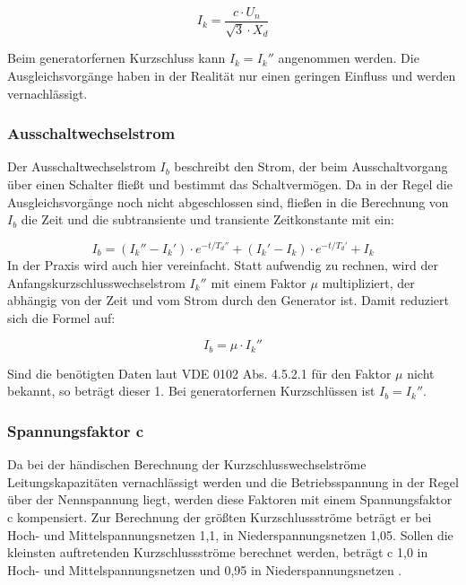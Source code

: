 \documentclass{scrartcl}
\begin{document}
\begin{onehalfspace}
\begin{equation}
I_k = \frac{c \cdot U_n}{\sqrt{3} \cdot X_d}
\end{equation}

 Beim generatorfernen Kurzschluss kann $I_k = I_k''$ angenommen werden. Die Ausgleichsvorgänge haben in der Realität nur einen geringen Einfluss und werden vernachlässigt.

\subsubsection{Ausschaltwechselstrom}
Der Ausschaltwechselstrom $I_b$ beschreibt den Strom, der beim Ausschaltvorgang über einen Schalter fließt und bestimmt das Schaltvermögen. Da in der Regel die Ausgleichsvorgänge noch nicht abgeschlossen sind, fließen in die Berechnung von $I_b$ die Zeit und die  subtransiente und transiente Zeitkonstante mit ein:

\begin{equation}
I_b = (I_k'' - I_k') \cdot e ^{-t/T_d''} +  (I_k' - I_k) \cdot e ^{-t/T_d'} + I_k
\end{equation}
In der Praxis wird auch hier vereinfacht. Statt aufwendig zu rechnen, wird der Anfangskurzschlusswechselstrom $I_k''$ mit einem Faktor $\mu$ multipliziert, der abhängig von der Zeit und vom Strom durch den Generator ist. Damit reduziert sich die Formel auf:

\begin{equation}
I_b =  \mu \cdot I_k''
\end{equation}

Sind die benötigten Daten laut VDE 0102 Abs. 4.5.2.1 für den Faktor $\mu$ nicht bekannt, so beträgt dieser 1. Bei generatorfernen Kurzschlüssen ist $I_b = I_k''$.


\subsubsection{Spannungsfaktor c}
Da bei der händischen Berechnung der Kurzschlusswechselströme Leitungskapazitäten vernachlässigt werden und die Betriebsspannung in der Regel über der Nennspannung liegt, werden diese Faktoren mit einem Spannungsfaktor c kompensiert. Zur Berechnung der größten Kurzschlussströme beträgt er bei Hoch- und Mittelspannungsnetzen 1,1, in Niederspannungsnetzen 1,05. Sollen die kleinsten auftretenden Kurzschlussströme berechnet werden, beträgt c 1,0 in Hoch- und Mittelspannungsnetzen und 0,95 in Niederspannungsnetzen \cite[S. 537]{Oeding2011}.


\end{onehalfspace}
\end{document}
